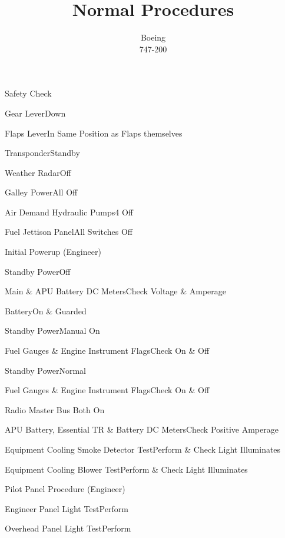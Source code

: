 \documentclass[sim-use]{checklist}
\title{Normal Procedures}
\subtitle{Boeing \\ 747-200}
\begin{document}
\begin{checklist}{Safety Check}
	\item{Gear Lever}{Down}
	\item{Flaps Lever}{In Same Position as Flaps themselves}
	\item{Transponder}{Standby}
	\item{Weather Radar}{Off}
	\item{Galley Power}{All Off}
	\item{Air Demand Hydraulic Pumps}{4 Off}
	\item{Fuel Jettison Panel}{All Switches Off}
\end{checklist}

\begin{checklist}{Initial Powerup (Engineer)}
	 {
		\item{Standby Power}{Off}
		\item{Main \& APU Battery DC Meters}{Check Voltage \& Amperage}
		\item{Battery}{On \& Guarded} 
	}
	 {
		\item{Standby Power}{Manual On}
		\item{Fuel Gauges \& Engine Instrument Flags}{Check On \& Off}
		\item{Standby Power}{Normal}
		\item{Fuel Gauges \& Engine Instrument Flags}{Check On \& Off}
	}
	\item{Radio Master Bus} {Both On}
	\item{APU Battery, Essential TR \& Battery DC Meters}{Check Positive Amperage}
	 {
		\item{Equipment Cooling Smoke Detector Test}{Perform \& Check Light Illuminates}
		\item{Equipment Cooling Blower Test}{Perform \& Check Light Illuminates}
	}
\end{checklist}

\begin{checklist}{Pilot Panel Procedure (Engineer)}
	\item{Engineer Panel Light Test}{Perform}
	\item{Overhead Panel Light Test}{Perform}
\end{checklist}
\end{document}
